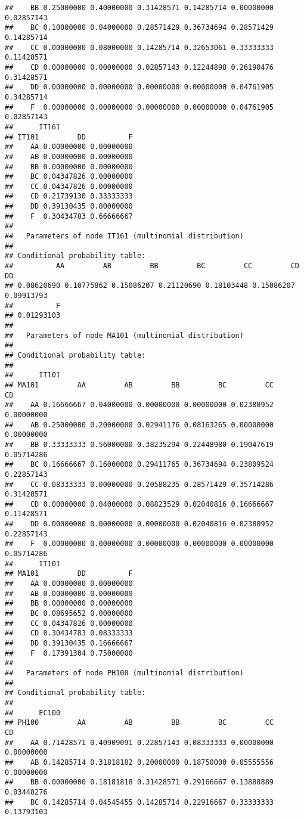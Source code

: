 \documentclass[
]{article}
\begin{document}
\begin{verbatim}
##    BB 0.25000000 0.40000000 0.31428571 0.14285714 0.00000000 0.02857143
##    BC 0.10000000 0.04000000 0.28571429 0.36734694 0.28571429 0.14285714
##    CC 0.00000000 0.08000000 0.14285714 0.32653061 0.33333333 0.11428571
##    CD 0.00000000 0.00000000 0.02857143 0.12244898 0.26190476 0.31428571
##    DD 0.00000000 0.00000000 0.00000000 0.00000000 0.04761905 0.34285714
##    F  0.00000000 0.00000000 0.00000000 0.00000000 0.04761905 0.02857143
##      IT161
## IT101         DD          F
##    AA 0.00000000 0.00000000
##    AB 0.00000000 0.00000000
##    BB 0.00000000 0.00000000
##    BC 0.04347826 0.00000000
##    CC 0.04347826 0.00000000
##    CD 0.21739130 0.33333333
##    DD 0.39130435 0.00000000
##    F  0.30434783 0.66666667
## 
##   Parameters of node IT161 (multinomial distribution)
## 
## Conditional probability table:
##          AA         AB         BB         BC         CC         CD         DD 
## 0.08620690 0.10775862 0.15086207 0.21120690 0.18103448 0.15086207 0.09913793 
##          F 
## 0.01293103 
## 
##   Parameters of node MA101 (multinomial distribution)
## 
## Conditional probability table:
##  
##      IT101
## MA101         AA         AB         BB         BC         CC         CD
##    AA 0.16666667 0.04000000 0.00000000 0.00000000 0.02380952 0.00000000
##    AB 0.25000000 0.20000000 0.02941176 0.08163265 0.00000000 0.00000000
##    BB 0.33333333 0.56000000 0.38235294 0.22448980 0.19047619 0.05714286
##    BC 0.16666667 0.16000000 0.29411765 0.36734694 0.23809524 0.22857143
##    CC 0.08333333 0.00000000 0.20588235 0.28571429 0.35714286 0.31428571
##    CD 0.00000000 0.04000000 0.08823529 0.02040816 0.16666667 0.11428571
##    DD 0.00000000 0.00000000 0.00000000 0.02040816 0.02380952 0.22857143
##    F  0.00000000 0.00000000 0.00000000 0.00000000 0.00000000 0.05714286
##      IT101
## MA101         DD          F
##    AA 0.00000000 0.00000000
##    AB 0.00000000 0.00000000
##    BB 0.00000000 0.00000000
##    BC 0.08695652 0.00000000
##    CC 0.04347826 0.00000000
##    CD 0.30434783 0.08333333
##    DD 0.39130435 0.16666667
##    F  0.17391304 0.75000000
## 
##   Parameters of node PH100 (multinomial distribution)
## 
## Conditional probability table:
##  
##      EC100
## PH100         AA         AB         BB         BC         CC         CD
##    AA 0.71428571 0.40909091 0.22857143 0.08333333 0.00000000 0.00000000
##    AB 0.14285714 0.31818182 0.20000000 0.18750000 0.05555556 0.00000000
##    BB 0.00000000 0.18181818 0.31428571 0.29166667 0.13888889 0.03448276
##    BC 0.14285714 0.04545455 0.14285714 0.22916667 0.33333333 0.13793103

\end{verbatim}
\end{document}
